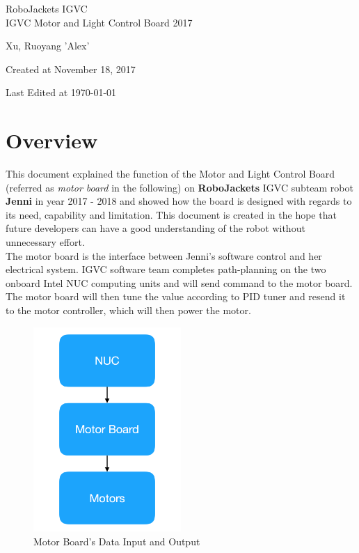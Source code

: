 \documentclass[letterpaper, 12pt]{article}
\begin{document}
\begin{titlepage}
\centering
	{\LARGE RoboJackets IGVC}\\
	\vspace{1cm}
	{\Large IGVC Motor and Light Control Board 2017}\\
	\vspace{1cm}
	{\Large Xu, Ruoyang 'Alex' \par}
	\vfill
	{\large Created at November 18, 2017}\\
	\vspace{1cm}
	{\large Last Edited at \today\par}
\end{titlepage}

\tableofcontents
\pagebreak

\section{Overview}
This document explained the function of the Motor and Light Control Board (referred as \emph{motor board} in the following) on \textbf{RoboJackets} IGVC subteam robot \textbf{Jenni} in year 2017 - 2018 and showed how the board is designed with regards to its need, capability and limitation. This document is created in the hope that future developers can have a good understanding of the robot without unnecessary effort. \vspace{6pt}\\
The motor board is the interface between Jenni's software control and her electrical system. IGVC software team completes path-planning on the two onboard Intel NUC computing units and will send command to the motor board. The motor board will then tune the value according to PID tuner and resend it to the motor controller, which will then power the motor.\\
\begin{figure}[h]
\centering
\includegraphics[width=0.5\textwidth]{UpandLow.png}
\caption{Motor Board's Data Input and Output}
\end{figure}
\end{document}
